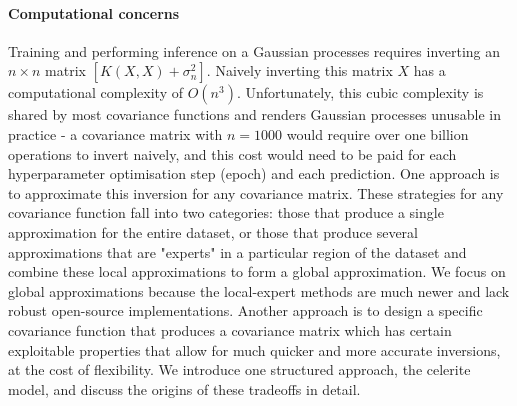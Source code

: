 \paragraph{Computational concerns}
Training and performing inference on a Gaussian processes requires inverting an $n \times n$ matrix $[K(X,X) + \sigma^2_n]$. Naively inverting this matrix $X$ has a computational complexity of $O(n^3)$. Unfortunately, this cubic complexity is shared by most covariance functions and renders Gaussian processes unusable in practice - a covariance matrix with $n = 1000$ would require over one billion operations to invert naively, and this cost would need to be paid for each hyperparameter optimisation step (epoch) and each prediction. One approach is to approximate this inversion for any covariance matrix. These strategies for any covariance function fall into two categories: those that produce a single approximation for the entire dataset, or those that produce several approximations that are "experts" in a particular region of the dataset and combine these local approximations to form a global approximation. We focus on global approximations because the local-expert methods are much newer and lack robust open-source implementations. Another approach is to design a specific covariance function that produces a covariance matrix which has certain exploitable properties that allow for much quicker and more accurate inversions, at the cost of flexibility. We introduce one structured approach, the celerite model, and discuss the origins of these tradeoffs in detail.

